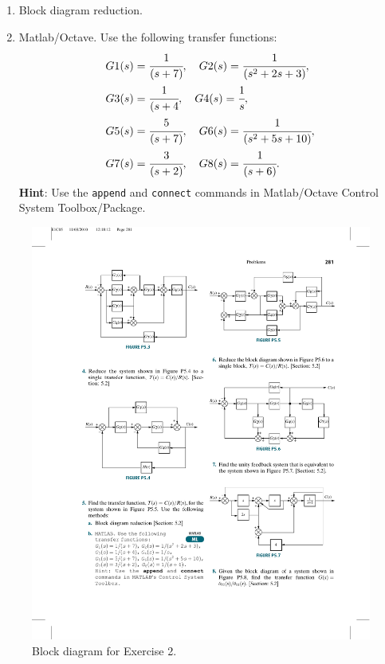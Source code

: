 \documentclass[a4paper,11pt]{article}
\begin{document}
\begin{enumerate}
\item Block diagram reduction.
\item Matlab/Octave. Use the following transfer functions:
\begin{align*}
G1(s)& =\cfrac{1}{(s+7)}, \quad G2(s)=\cfrac{1}{(s^2 + 2 s+3)},\\
G3(s)& =\cfrac{1}{(s+4}, \quad G4(s) =\cfrac{1}{s},\\
G5(s)& =\cfrac{5}{(s+ 7)}, \quad G6(s) =\cfrac{1}{(s^2 + 5s + 10)},\\
G7(s)&= \cfrac{3}{(s+ 2)}, \quad G8(s) = \cfrac{1}{(s + 6)}. 
\end{align*}
{\bf Hint}: Use the {\tt append} and {\tt connect} commands in Matlab/Octave Control System Toolbox/Package.
\end{enumerate}

\begin{figure}[ht!] \begin{center}
\includegraphics[width=1\textwidth]{Figures/blocks_ex}
 \caption{Block diagram for Exercise 2.} \label{fig:ex2}
\end{center} \end{figure}
\end{document}

